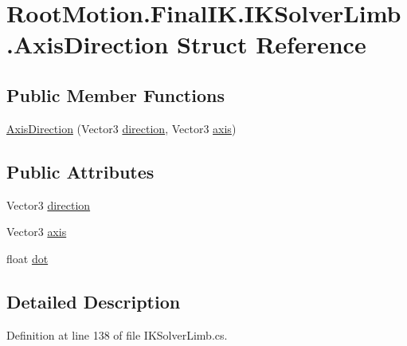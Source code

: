 \hypertarget{struct_root_motion_1_1_final_i_k_1_1_i_k_solver_limb_1_1_axis_direction}{}\section{Root\+Motion.\+Final\+I\+K.\+I\+K\+Solver\+Limb.\+Axis\+Direction Struct Reference}
\label{struct_root_motion_1_1_final_i_k_1_1_i_k_solver_limb_1_1_axis_direction}
\subsection*{Public Member Functions}
\begin{DoxyCompactItemize}
\item 
\mbox{\hyperlink{struct_root_motion_1_1_final_i_k_1_1_i_k_solver_limb_1_1_axis_direction_ae513fb0c7f3a823e8a8a370b98f8d92f}{Axis\+Direction}} (Vector3 \mbox{\hyperlink{struct_root_motion_1_1_final_i_k_1_1_i_k_solver_limb_1_1_axis_direction_aaf074ffb1d62e864dd5e8630ecc8f034}{direction}}, Vector3 \mbox{\hyperlink{struct_root_motion_1_1_final_i_k_1_1_i_k_solver_limb_1_1_axis_direction_a6281343ec34174667074a2f213b2a7ce}{axis}})
\end{DoxyCompactItemize}
\subsection*{Public Attributes}
\begin{DoxyCompactItemize}
\item 
Vector3 \mbox{\hyperlink{struct_root_motion_1_1_final_i_k_1_1_i_k_solver_limb_1_1_axis_direction_aaf074ffb1d62e864dd5e8630ecc8f034}{direction}}
\item 
Vector3 \mbox{\hyperlink{struct_root_motion_1_1_final_i_k_1_1_i_k_solver_limb_1_1_axis_direction_a6281343ec34174667074a2f213b2a7ce}{axis}}
\item 
float \mbox{\hyperlink{struct_root_motion_1_1_final_i_k_1_1_i_k_solver_limb_1_1_axis_direction_ac307514ff711a50a31d4bee3fd72556d}{dot}}
\end{DoxyCompactItemize}


\subsection{Detailed Description}


Definition at line 138 of file I\+K\+Solver\+Limb.\+cs.



